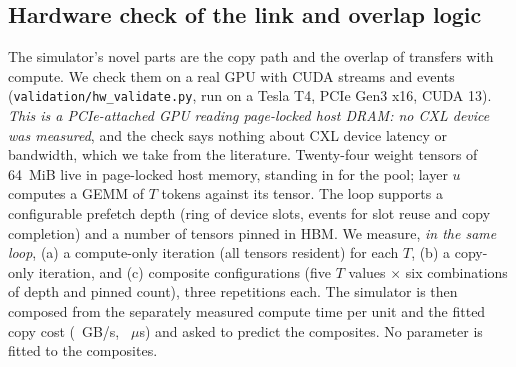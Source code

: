 \documentclass[preprint,12pt]{elsarticle}
\begin{document}
\subsection{Hardware check of the link and overlap logic}
\label{sec:validation}

The simulator's novel parts are the copy path and the overlap of transfers with compute. We check them on a real GPU with CUDA streams and events (\texttt{validation/hw\_validate.py}, run on a Tesla T4, PCIe Gen3 x16, CUDA 13). \emph{This is a PCIe-attached GPU reading page-locked host DRAM: no CXL device was measured}, and the check says nothing about CXL device latency or bandwidth, which we take from the literature. Twenty-four weight tensors of 64~MiB live in page-locked host memory, standing in for the pool; layer $u$ computes a GEMM of $T$ tokens against its tensor. The loop supports a configurable prefetch depth (ring of device slots, events for slot reuse and copy completion) and a number of tensors pinned in HBM. We measure, \emph{in the same loop}, (a) a compute-only iteration (all tensors resident) for each $T$, (b) a copy-only iteration, and (c) \nHwN{} composite configurations (five $T$ values $\times$ six combinations of depth and pinned count), three repetitions each. The simulator is then composed from the separately measured compute time per unit and the fitted copy cost (\nHwPinnedBw~GB/s, \nHwLatUs~$\mu$s) and asked to predict the composites. No parameter is fitted to the composites.


\end{document}
